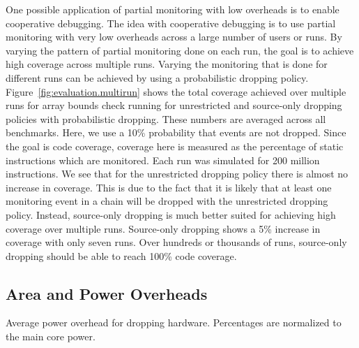 One possible application of partial monitoring with low overheads is to enable
cooperative debugging. 
The idea with cooperative debugging is to use partial
monitoring with very low overheads across a large number of users or runs. By
varying the pattern of partial monitoring done on each run, the goal is to
achieve high coverage across multiple runs. Varying the monitoring that is
done for different runs can be achieved by using a probabilistic dropping policy.
Figure~\ref{fig:evaluation.multirun} shows the total
coverage achieved over multiple runs for array bounds check running for
unrestricted and source-only dropping policies with probabilistic dropping.
These numbers are averaged across all benchmarks. Here, we use a 10\%
probability
that events are not dropped. Since the goal is code coverage, coverage here is
measured as the percentage of static instructions which are monitored. Each run
was simulated for 200 million instructions. 
We see that for the unrestricted dropping policy there is almost no increase in
coverage.  This is due to the fact that it is likely that at least one
monitoring event in a chain will be dropped with the unrestricted dropping
policy. 
Instead, source-only
dropping is much better suited for achieving high coverage over multiple runs.
Source-only dropping shows a 5\% increase in coverage with only seven runs.
Over hundreds or thousands of runs, source-only dropping should be able to
reach 100\% code coverage.

\subsection{Area and Power Overheads}

\begin{table}[tb]
  \begin{center}
    \vspace{-0.0in}
    \begin{footnotesize}
    
    \end{footnotesize}
    \caption{Average power overhead for dropping hardware. Percentages 
    are normalized to the main core power.}
    \vspace{-0.2in}
    \label{tab:evaluation.area_power}
  \end{center}
\end{table}


